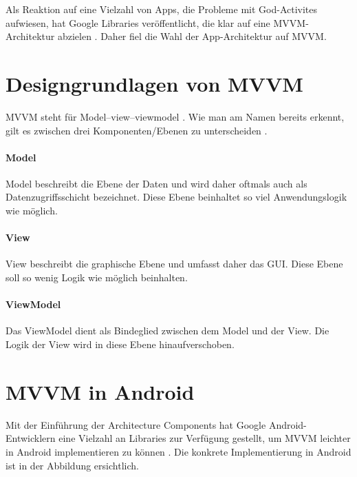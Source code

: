 Als Reaktion auf eine Vielzahl von Apps, die Probleme mit God-Activites
aufwiesen, hat Google Libraries veröffentlicht, die klar auf eine
MVVM-Architektur abzielen \cite{mvvm}. Daher fiel die Wahl der
App-Architektur auf MVVM.

\hypertarget{designgrundlagen-von-mvvm}{%
\section{Designgrundlagen von MVVM}\label{designgrundlagen-von-mvvm}}

MVVM steht für Model--view--viewmodel \cite{mvvm-wiki}. Wie man am Namen
bereits erkennt, gilt es zwischen drei Komponenten/Ebenen zu
unterscheiden \cite{mvvm-article}.

\hypertarget{model}{%
\paragraph{Model}\label{model}}

Model beschreibt die Ebene der Daten und wird daher oftmals auch als
Datenzugriffsschicht bezeichnet. Diese Ebene beinhaltet so viel
Anwendungslogik wie möglich.

\hypertarget{view}{%
\paragraph{View}\label{view}}

View beschreibt die graphische Ebene und umfasst daher das GUI. Diese
Ebene soll so wenig Logik wie möglich beinhalten.

\hypertarget{viewmodel}{%
\paragraph{ViewModel}\label{viewmodel}}

Das ViewModel dient als Bindeglied zwischen dem Model und der View. Die
Logik der View wird in diese Ebene hinaufverschoben.

\hypertarget{mvvm-in-android}{%
\section{MVVM in Android}\label{mvvm-in-android}}

Mit der Einführung der Architecture Components hat Google
Android-Entwicklern eine Vielzahl an Libraries zur Verfügung gestellt,
um MVVM leichter in Android implementieren zu können
\cite{mvvm-architecture-components}. Die konkrete Implementierung in
Android ist in der Abbildung ersichtlich.

